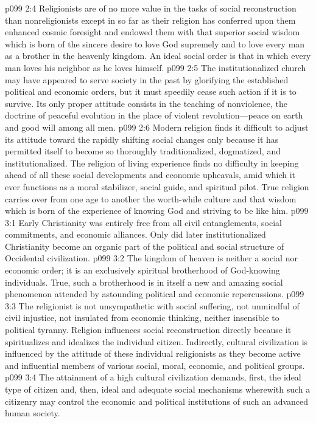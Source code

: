 \vs p099 2:4 Religionists are of no more value in the tasks of social reconstruction than nonreligionists except in so far as their religion has conferred upon them enhanced cosmic foresight and endowed them with that superior social wisdom which is born of the sincere desire to love God supremely and to love every man as a brother in the heavenly kingdom. An ideal social order is that in which every man loves his neighbor as he loves himself.
\pc \vs p099 2:5 The institutionalized church may have appeared to serve society in the past by glorifying the established political and economic orders, but it must speedily cease such action if it is to survive. Its only proper attitude consists in the teaching of nonviolence, the doctrine of peaceful evolution in the place of violent revolution---peace on earth and good will among all men.
\vs p099 2:6 Modern religion finds it difficult to adjust its attitude toward the rapidly shifting social changes only because it has permitted itself to become so thoroughly traditionalized, dogmatized, and institutionalized. The religion of living experience finds no difficulty in keeping ahead of all these social developments and economic upheavals, amid which it ever functions as a moral stabilizer, social guide, and spiritual pilot. True religion carries over from one age to another the worth\hyp{}while culture and that wisdom which is born of the experience of knowing God and striving to be like him.
\vs p099 3:1 Early Christianity was entirely free from all civil entanglements, social commitments, and economic alliances. Only did later institutionalized Christianity become an organic part of the political and social structure of Occidental civilization.
\pc \vs p099 3:2 The kingdom of heaven is neither a social nor economic order; it is an exclusively spiritual brotherhood of God\hyp{}knowing individuals. True, such a brotherhood is in itself a new and amazing social phenomenon attended by astounding political and economic repercussions.
\vs p099 3:3 The religionist is not unsympathetic with social suffering, not unmindful of civil injustice, not insulated from economic thinking, neither insensible to political tyranny. Religion influences social reconstruction directly because it spiritualizes and idealizes the individual citizen. Indirectly, cultural civilization is influenced by the attitude of these individual religionists as they become active and influential members of various social, moral, economic, and political groups.\plusone
\pc \vs p099 3:4 The attainment of a high cultural civilization demands, first, the ideal type of citizen and, then, ideal and adequate social mechanisms wherewith such a citizenry may control the economic and political institutions of such an advanced human society.
